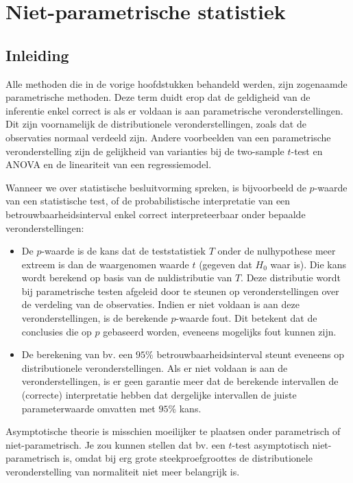 \documentclass[12pt,dutch,coursenotes]{book}
\theoremstyle{definition}
\theoremstyle{definition}
\theoremstyle{definition}
\theoremstyle{remark}
\begin{document}
\chapter{Niet-parametrische
statistiek}\label{niet-parametrische-statistiek}

\section{Inleiding}\label{inleiding-6}

Alle methoden die in de vorige hoofdstukken behandeld werden, zijn
zogenaamde parametrische methoden. Deze term duidt erop dat de
geldigheid van de inferentie enkel correct is als er voldaan is aan
parametrische veronderstellingen. Dit zijn voornamelijk de
distributionele veronderstellingen, zoals dat de observaties normaal
verdeeld zijn. Andere voorbeelden van een parametrische veronderstelling
zijn de gelijkheid van varianties bij de two-sample \(t\)-test en ANOVA
en de lineariteit van een regressiemodel.

Wanneer we over statistische besluitvorming spreken, is bijvoorbeeld de
\(p\)-waarde van een statistische test, of de probabilistische
interpretatie van een betrouwbaarheidsinterval enkel correct
interpreteerbaar onder bepaalde veronderstellingen:

\begin{itemize}
\item
  De \(p\)-waarde is de kans dat de teststatistiek \(T\) onder de
  nulhypothese meer extreem is dan de waargenomen waarde \(t\) (gegeven
  dat \(H_0\) waar is). Die kans wordt berekend op basis van de
  nuldistributie van \(T\). Deze distributie wordt bij parametrische
  testen afgeleid door te steunen op veronderstellingen over de
  verdeling van de observaties. Indien er niet voldaan is aan deze
  veronderstellingen, is de berekende \(p\)-waarde fout. Dit betekent
  dat de conclusies die op \(p\) gebaseerd worden, eveneens mogelijks
  fout kunnen zijn.
\item
  De berekening van bv. een \(95\%\) betrouwbaarheidsinterval steunt
  eveneens op distributionele veronderstellingen. Als er niet voldaan is
  aan de veronderstellingen, is er geen garantie meer dat de berekende
  intervallen de (correcte) interpretatie hebben dat dergelijke
  intervallen de juiste parameterwaarde omvatten met \(95\%\) kans.
\end{itemize}

Asymptotische theorie is misschien moeilijker te plaatsen onder
parametrisch of niet-parametrisch. Je zou kunnen stellen dat bv. een
\(t\)-test asymptotisch niet-parametrisch is, omdat bij erg grote
steekproefgroottes de distributionele veronderstelling van normaliteit
niet meer belangrijk is.
\end{document}
